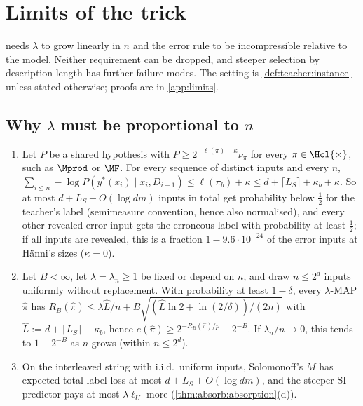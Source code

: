 \section{Limits of the trick}\label{sec:limits}

 needs $\lambda$ to grow linearly in $n$ and the error rule to be incompressible relative to the model. Neither requirement can be dropped, and steeper selection by description length has further failure modes. The setting is \cref{def:teacher:instance} unless stated otherwise; proofs are in \cref{app:limits}.

\subsection{Why \texorpdfstring{$\lambda$}{lambda} must be proportional to \texorpdfstring{$n$}{n}}\label{sec:limits:schedule}

\begin{proposition}\label{prop:limits:plain}
\begin{enumerate}[label=(\alph*)]
\item Let $P$ be a shared hypothesis with $P\ge2^{-\ell(\pi)-\kappa}\nu_\pi$ for every $\pi\in\Hcl{\times}$, such as $\Mprod$ or $\MF$. For every sequence of distinct inputs and every $n$, $\sum_{i\le n}-\log P(y^*(x_i)\mid x_i,D_{i-1})\le\ell(\pi_b)+\kappa\le d+\lceil L_S\rceil+\kappa_b+\kappa$. So at most $d+L_S+O(\log dm)$ inputs in total get probability below $\frac12$ for the teacher's label (semimeasure convention, hence also normalised), and every other revealed error input gets the erroneous label with probability at least $\frac12$; if all inputs are revealed, this is a fraction $1-9.6\cdot10^{-24}$ of the error inputs at H\"anni's sizes ($\kappa=0$).
\item Let $B<\infty$, let $\lambda=\lambda_n\ge1$ be fixed or depend on $n$, and draw $n\le2^d$ inputs uniformly without replacement. With probability at least $1-\delta$, every $\lambda$-MAP $\hat\pi$ has $R_B(\hat\pi)\le\lambda\hat L/n+B\sqrt{(\hat L\ln2+\ln(2/\delta))/(2n)}$ with $\hat L:=d+\lceil L_S\rceil+\kappa_b$, hence $e(\hat\pi)\ge2^{-R_B(\hat\pi)/p}-2^{-B}$. If $\lambda_n/n\to0$, this tends to $1-2^{-B}$ as $n$ grows (within $n\le2^d$).
\item On the interleaved string with i.i.d.\ uniform inputs, Solomonoff's $M$ has expected total label loss at most $d+L_S+O(\log dm)$, and the steeper SI predictor pays at most $\lambda\ell_U$ more (\cref{thm:absorb:absorption}(d)).
\end{enumerate}
\end{proposition}

